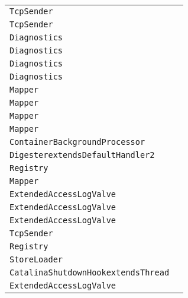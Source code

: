 \begin{center}
\begin{tabular}{ll}
\lstinline/TcpSender/&\raisebox{0pt}{\lstinline/intsend(String)/}\\ 
\lstinline/TcpSender/&\raisebox{0pt}{\lstinline/intsend(String)/}\\ 
\lstinline/Diagnostics/&\raisebox{0pt}{\lstinline/setVerboseGarbageCollection(boolean)/}\\ 
\lstinline/Diagnostics/&\raisebox{0pt}{\lstinline/setVerboseGarbageCollection(boolean)/}\\ 
\lstinline/Diagnostics/&\raisebox{0pt}{\lstinline/setVerboseGarbageCollection(boolean)/}\\ 
\lstinline/Diagnostics/&\raisebox{0pt}{\lstinline/setVerboseGarbageCollection(boolean)/}\\ 
\lstinline/Mapper/&\raisebox{0pt}{\lstinline/find(String)/}\\ 
\lstinline/Mapper/&\raisebox{0pt}{\lstinline/find(String)/}\\ 
\lstinline/Mapper/&\raisebox{0pt}{\lstinline/find(String)/}\\ 
\lstinline/Mapper/&\raisebox{0pt}{\lstinline/find(String)/}\\ 
\lstinline/ContainerBackgroundProcessor/&\raisebox{0pt}{\lstinline/processChildren(Container)/}\\ 
\lstinline/DigesterextendsDefaultHandler2/&\raisebox{0pt}{\lstinline/createSAXException(String)/}\\ 
\lstinline/Registry/&\raisebox{0pt}{\lstinline/loadDescriptors(String)/}\\ 
\lstinline/Mapper/&\raisebox{0pt}{\lstinline/find(String)/}\\ 
\lstinline/ExtendedAccessLogValve/&\raisebox{0pt}{\lstinline/getServletRequestElement(String)/}\\ 
\lstinline/ExtendedAccessLogValve/&\raisebox{0pt}{\lstinline/getServletRequestElement(String)/}\\ 
\lstinline/ExtendedAccessLogValve/&\raisebox{0pt}{\lstinline/getServletRequestElement(String)/}\\ 
\lstinline/TcpSender/&\raisebox{0pt}{\lstinline/intsend(Stringmess)/}\\ 
\lstinline/Registry/&\raisebox{0pt}{\lstinline/loadDescriptors(String)/}\\ 
\lstinline/StoreLoader/&\raisebox{0pt}{\lstinline/load()/}\\ 
\lstinline/CatalinaShutdownHookextendsThread/&\raisebox{0pt}{\lstinline/run()/}\\ 
\lstinline/ExtendedAccessLogValve/&\raisebox{0pt}{\lstinline/getServletRequestElement(String)/}\\ 

\end{tabular}
\end{center}
